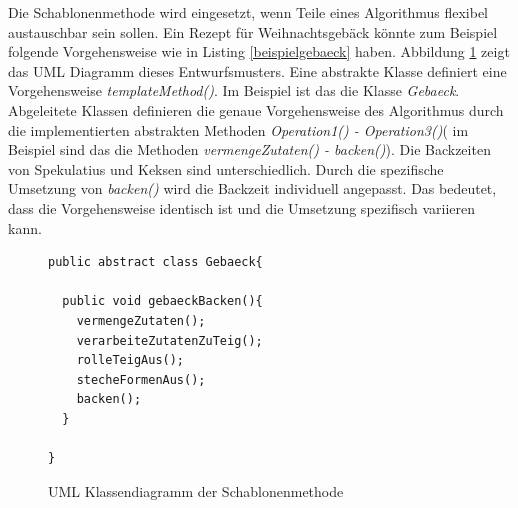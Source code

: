 Die Schablonenmethode wird eingesetzt, wenn Teile eines Algorithmus flexibel austauschbar sein sollen. Ein Rezept für Weihnachtsgebäck könnte zum Beispiel folgende Vorgehensweise wie in Listing \ref{beispielgebaeck} haben. Abbildung \ref{templatemethod} zeigt das UML Diagramm dieses Entwurfsmusters. Eine abstrakte Klasse definiert eine Vorgehensweise \textit{templateMethod()}. Im Beispiel ist das die Klasse \textit{Gebaeck}. Abgeleitete Klassen definieren die genaue Vorgehensweise des Algorithmus durch die implementierten abstrakten Methoden \textit{Operation1() - Operation3()}( im Beispiel sind das die Methoden \textit{vermengeZutaten() - backen()}). Die Backzeiten von Spekulatius und Keksen sind unterschiedlich. Durch die spezifische Umsetzung von \textit{backen()} wird die Backzeit individuell angepasst. Das bedeutet, dass die Vorgehensweise identisch ist und die Umsetzung spezifisch variieren kann.
\begin{figure}[htbp]
\begin{lstlisting}[frame=leftline]
public abstract class Gebaeck{
		
  public void gebaeckBacken(){
    vermengeZutaten();
    verarbeiteZutatenZuTeig();
    rolleTeigAus();
    stecheFormenAus();
    backen();
  }
  
}
\end{lstlisting}

\end{figure}

\begin{figure}[htbp]
  \vspace{0.5cm}
  \centering
   \caption{UML Klassendiagramm der Schablonenmethode\cite[S. 69]{starke:swa}}
  \label{templatemethod}
  \vspace{0.5cm}
\end{figure}

